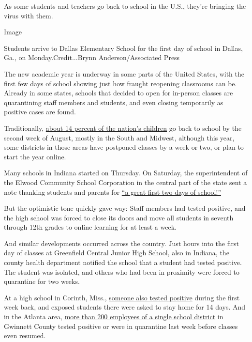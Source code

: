 As some students and teachers go back to school in the U.S., they're
bringing the virus with them.

Image

Students arrive to Dallas Elementary School for the first day of school
in Dallas, Ga., on Monday.Credit...Brynn Anderson/Associated Press

The new academic year is underway in some parts of the United States,
with the first few days of school showing just how fraught reopening
classrooms can be. Already in some states, schools that decided to open
for in-person classes are quarantining staff members and students, and
even closing temporarily as positive cases are found.

Traditionally,
\href{https://www.pewresearch.org/fact-tank/2019/08/14/back-to-school-dates-u-s/}{about
14 percent of the nation's children} go back to school by the second
week of August, mostly in the South and Midwest, although this year,
some districts in those areas have postponed classes by a week or two,
or plan to start the year online.

Many schools in Indiana started on Thursday. On Saturday, the
superintendent of the Elwood Community School Corporation in the central
part of the state sent a note thanking students and parents for
\href{https://www.facebookcorewwwi.onion/ElwoodCommunitySchools/photos/pcb.1875944365880857/1875944205880873/?type=3\&theater}{``a
great first two days of school!''}

But the optimistic tone quickly gave way: Staff members had tested
positive, and the high school was forced to close its doors and move all
students in seventh through 12th grades to online learning for at least
a week.

And similar developments occurred across the country. Just hours into
the first day of classes at
\href{https://www.nytimes3xbfgragh.onion/2020/08/01/us/schools-reopening-indiana-coronavirus.html}{Greenfield
Central Junior High School}, also in Indiana, the county health
department notified the school that a student had tested positive. The
student was isolated, and others who had been in proximity were forced
to quarantine for two weeks.

At a high school in Corinth, Miss.,
\href{https://www.facebookcorewwwi.onion/corinthschooldistrict/?tn-str=k*F}{someone
also tested positive} during the first week back, and exposed students
there were asked to stay home for 14 days. And in the Atlanta area,
\href{https://www.ajc.com/news/atlanta-news/covid-cases-exposure-have-260-gwinnett-school-employees-not-working/RVZP4UFBPFHDNJJ73MNUFIKEPY/}{more
than 200 employees of a single school district} in Gwinnett County
tested positive or were in quarantine last week before classes even
resumed.

